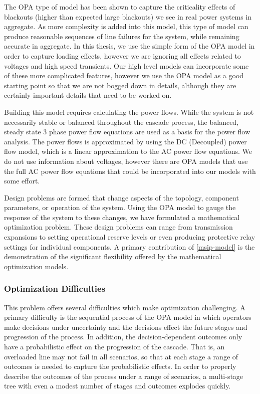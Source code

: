 The OPA type of model has been shown to capture the criticality effects of blackouts (higher than expected large blackouts) we see in real power systems in aggregate.  As more complexity is added into this model, this type of model can produce reasonable sequences of line failures for the system, while remaining accurate in aggregate. In this thesis, we use the simple form of the OPA model in order to capture loading effects, however we are ignoring all effects related to voltages and high speed transients.  Our high level models can incorporate some of these more complicated features, however we use the OPA model as a good starting point so that we are not bogged down in details, although they are certainly important details that need to be worked on.

Building this model requires calculating the power flows.  While the system is not necessarily stable or balanced throughout the cascade process, the balanced, steady state 3 phase power flow equations are used as a basis for the power flow analysis.  The power flows is approximated by using the DC (Decoupled) power flow model, which is a linear approximation to the AC power flow equations.  We do not use information about voltages, however there are OPA models that use the full AC power flow equations that could be incorporated into our models with some effort.

Design problems are formed that change aspects of the topology, component parameters, or operation of the system.  Using the OPA model to gauge the response of the system to these changes, we have formulated a mathematical optimization problem.  These design problems can range from transmission expansions to setting operational reserve levels or even producing protective relay settings for individual components.  A primary contribution of \cref{msip-model} is the demonstration of the significant flexibility offered by the mathematical optimization models.

\subsubsection{Optimization Difficulties}
This problem offers several difficulties which make optimization challenging.  A primary difficulty is the sequential process of the OPA model in which operators make decisions under uncertainty and the decisions effect the future stages and progression of the process.  In addition, the decision-dependent outcomes only have a probabilistic effect on the progression of the cascade.  That is, an overloaded line may not fail in all scenarios, so that at each stage a range of outcomes is needed to capture the probabilistic effects.  In order to properly describe the outcomes of the process under a range of scenarios, a multi-stage tree with even a modest number of stages and outcomes explodes quickly.

